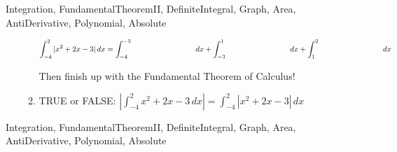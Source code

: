 \begin{tagblock}{Integration, FundamentalTheoremII, DefiniteIntegral, Graph, Area, AntiDerivative, Polynomial, Absolute }
\begin{question}
\begin{enumerate}
\begin{enumerate}
\[  \int_{-4}^2 |x^2+2x-3| \, dx = \int_{-4}^{-3} \hspace{1.15in} dx +  \int_{-3}^1 \hspace{1.15in} dx +  \int_1^2 \hspace{1.15in} dx \]

Then finish up with the Fundamental Theorem of Calculus!  



\vfill
\item TRUE or FALSE:  $\displaystyle | \int_{-4}^2 x^2+2x-3 \, dx | =  \int_{-4}^2 |x^2+2x-3| \, dx$  



\end{enumerate} 
\end{enumerate} 


	
	
\begin{tags}
	   Integration, FundamentalTheoremII, DefiniteIntegral, Graph, Area, AntiDerivative, Polynomial, Absolute
\end{tags}
	
\begin{diary}
	   
\end{diary}
	
\begin{solution}
	   
	    \end{enumerate}
\end{solution}
	
\end{question}

\end{tagblock}

